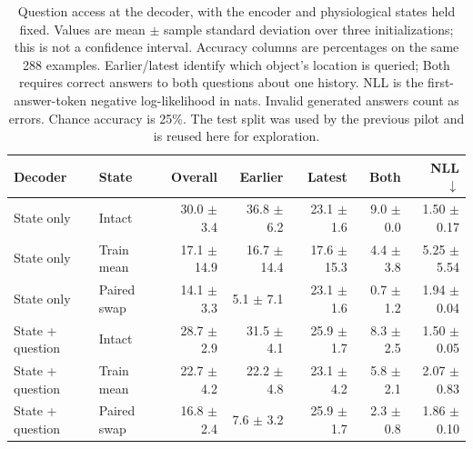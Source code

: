 \begin{table}[t]
\centering\small
\setlength{\tabcolsep}{3.5pt}
\caption{Question access at the decoder, with the encoder and physiological states held fixed. Values are mean $\pm$ sample standard deviation over three initializations; this is not a confidence interval. Accuracy columns are percentages on the same 288 examples. Earlier/latest identify which object's location is queried; Both requires correct answers to both questions about one history. NLL is the first-answer-token negative log-likelihood in nats. Invalid generated answers count as errors. Chance accuracy is 25\%. The test split was used by the previous pilot and is reused here for exploration.}
\label{tab:question-decoder}
\begin{tabular}{@{}llrrrrr@{}}
\toprule
Decoder & State & Overall & Earlier & Latest & Both & NLL $\downarrow$ \\
\midrule
State only & Intact & 30.0 $\pm$ 3.4 & 36.8 $\pm$ 6.2 & 23.1 $\pm$ 1.6 & 9.0 $\pm$ 0.0 & 1.50 $\pm$ 0.17 \\
State only & Train mean & 17.1 $\pm$ 14.9 & 16.7 $\pm$ 14.4 & 17.6 $\pm$ 15.3 & 4.4 $\pm$ 3.8 & 5.25 $\pm$ 5.54 \\
State only & Paired swap & 14.1 $\pm$ 3.3 & 5.1 $\pm$ 7.1 & 23.1 $\pm$ 1.6 & 0.7 $\pm$ 1.2 & 1.94 $\pm$ 0.04 \\
\midrule
State + question & Intact & 28.7 $\pm$ 2.9 & 31.5 $\pm$ 4.1 & 25.9 $\pm$ 1.7 & 8.3 $\pm$ 2.5 & 1.50 $\pm$ 0.05 \\
State + question & Train mean & 22.7 $\pm$ 4.2 & 22.2 $\pm$ 4.8 & 23.1 $\pm$ 4.2 & 5.8 $\pm$ 2.1 & 2.07 $\pm$ 0.83 \\
State + question & Paired swap & 16.8 $\pm$ 2.4 & 7.6 $\pm$ 3.2 & 25.9 $\pm$ 1.7 & 2.3 $\pm$ 0.8 & 1.86 $\pm$ 0.10 \\
\bottomrule
\end{tabular}
\end{table}
